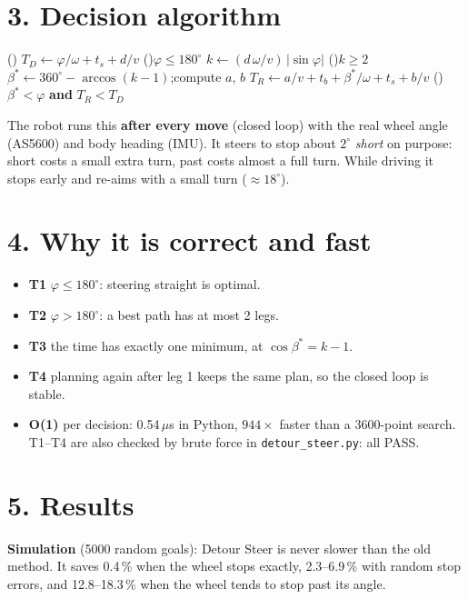 \documentclass[11pt,a4paper]{article}
\begin{document}
\section*{3. Decision algorithm}
{\small
\begin{algorithm}[H]
\Pro(){}{
  $T_D \leftarrow \varphi/\omega + t_s + d/v$
  \lIf(){$\varphi \le 180^\circ$}{}
  $k \leftarrow (d\,\omega/v)\,\lvert\sin\varphi\rvert$\;
  \lIf(){$k \ge 2$}{}
  $\beta^\ast \leftarrow 360^\circ - \arccos(k-1)$;\quad compute $a$, $b$\;
  $T_R \leftarrow a/v + t_b + \beta^\ast/\omega + t_s + b/v$\;
  \lIf(){$\beta^\ast < \varphi$ \textbf{and} $T_R < T_D$}{}
  \;
}
\end{algorithm}
}
The robot runs this \textbf{after every move} (closed loop) with the real wheel angle (AS5600) and body
heading (IMU). It steers to stop about $2^\circ$ \emph{short} on purpose: short costs a small extra turn,
past costs almost a full turn. While driving it stops early and re-aims with a small turn ($\approx 18^\circ$).

\section*{4. Why it is correct and fast}
\begin{itemize}\setlength\itemsep{0pt}
\item \textbf{T1} $\varphi \le 180^\circ$: steering straight is optimal.
\item \textbf{T2} $\varphi > 180^\circ$: a best path has at most 2 legs.
\item \textbf{T3} the time has exactly one minimum, at $\cos\beta^\ast = k-1$.
\item \textbf{T4} planning again after leg 1 keeps the same plan, so the closed loop is stable.
\item \textbf{O(1)} per decision: 0.54\,$\mu$s in Python, $944\times$ faster than a 3600-point search.
      T1--T4 are also checked by brute force in \texttt{detour\_steer.py}: all PASS.
\end{itemize}

\section*{5. Results}
\textbf{Simulation} (5000 random goals): Detour Steer is never slower than the old method.
It saves 0.4\,\% when the wheel stops exactly, 2.3--6.9\,\% with random stop errors,
and 12.8--18.3\,\% when the wheel tends to stop past its angle.
\end{document}
